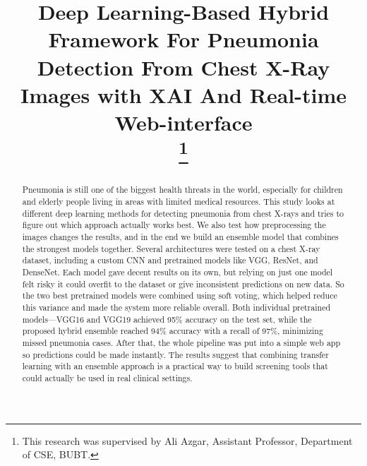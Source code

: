 \documentclass[conference]{IEEEtran}
\begin{document}
\title{Deep Learning-Based Hybrid Framework For Pneumonia Detection From Chest X-Ray Images with XAI And Real-time Web-interface\\
\thanks{This research was supervised by Ali Azgar, Assistant Professor, Department of CSE, BUBT.}
}

\author{
}

\maketitle

\begin{abstract}
Pneumonia is still one of the biggest health threats in the world, especially for children and elderly people living in areas with limited medical resources. This study looks at different deep learning methods for detecting pneumonia from chest X-rays and tries to figure out which approach actually works best. We also test how preprocessing the images changes the results, and in the end we build an ensemble model that combines the strongest models together. Several architectures were tested on a chest X-ray dataset, including a custom CNN and pretrained models like VGG, ResNet, and DenseNet. Each model gave decent results on its own, but relying on just one model felt risky it could overfit to the dataset or give inconsistent predictions on new data. So the two best pretrained models were combined using soft voting, which helped reduce this variance and made the system more reliable overall. Both individual pretrained models—VGG16 and VGG19 achieved 95\% accuracy on the test set, while the proposed hybrid ensemble reached 94\% accuracy with a recall of 97\%, minimizing missed pneumonia cases. After that, the whole pipeline was put into a simple web app so predictions could be made instantly. The results suggest that combining transfer learning with an ensemble approach is a practical way to build screening tools that could actually be used in real clinical settings.
\end{abstract}
\end{document}
